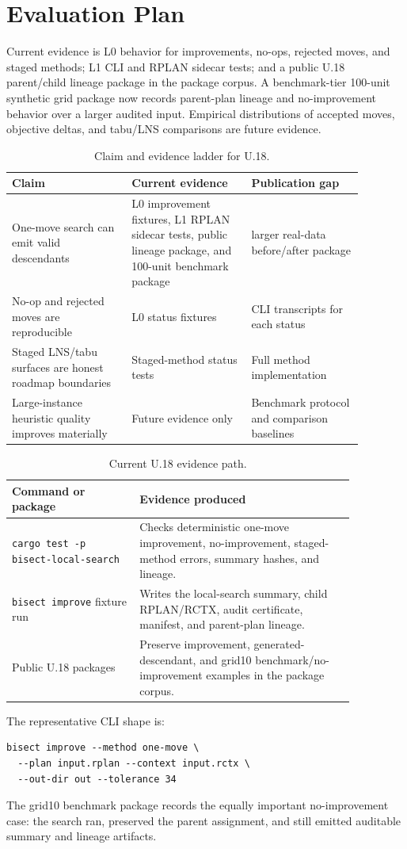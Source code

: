 \section{Evaluation Plan}

Current evidence is L0 behavior for improvements, no-ops, rejected moves, and
staged methods; L1 CLI and RPLAN sidecar tests; and a public U.18 parent/child
lineage package in the package corpus. A benchmark-tier 100-unit synthetic grid
package now records parent-plan lineage and no-improvement behavior over a
larger audited input. Empirical distributions of accepted moves, objective
deltas, and tabu/LNS comparisons are future evidence.

\begin{table}[htbp]
\centering
\small
\begin{tabular}{p{0.30\linewidth}p{0.30\linewidth}p{0.28\linewidth}}
\toprule
Claim & Current evidence & Publication gap \\
\midrule
One-move search can emit valid descendants & L0 improvement fixtures, L1
RPLAN sidecar tests, public lineage package, and 100-unit benchmark package &
larger real-data before/after package \\
No-op and rejected moves are reproducible & L0 status fixtures & CLI
transcripts for each status \\
Staged LNS/tabu surfaces are honest roadmap boundaries & Staged-method status
tests & Full method implementation \\
Large-instance heuristic quality improves materially & Future evidence only &
Benchmark protocol and comparison baselines \\
\bottomrule
\end{tabular}
\caption{Claim and evidence ladder for U.18.}
\end{table}

\begin{table}[htbp]
\centering
\small
\begin{tabular}{p{0.32\linewidth}p{0.54\linewidth}}
\toprule
Command or package & Evidence produced \\
\midrule
\texttt{cargo test -p bisect-local-search} & Checks deterministic one-move
improvement, no-improvement, staged-method errors, summary hashes, and lineage. \\
\texttt{bisect improve} fixture run & Writes the local-search summary, child
RPLAN/RCTX, audit certificate, manifest, and parent-plan lineage. \\
Public U.18 packages & Preserve improvement, generated-descendant, and grid10
benchmark/no-improvement examples in the package corpus. \\
\bottomrule
\end{tabular}
\caption{Current U.18 evidence path.}
\end{table}

The representative CLI shape is:
\begin{verbatim}
bisect improve --method one-move \
  --plan input.rplan --context input.rctx \
  --out-dir out --tolerance 34
\end{verbatim}
The grid10 benchmark package records the equally important no-improvement case:
the search ran, preserved the parent assignment, and still emitted auditable
summary and lineage artifacts.
